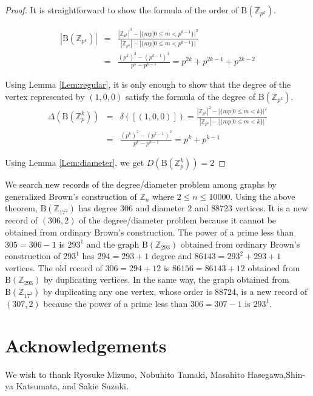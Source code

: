 \documentclass{article}
\newcommand{\Z}{\mathbb Z}
\newcommand{\B}{\mathrm{B}}
\begin{document}
\begin{proof}
It is straightforward to show the formula of the order of $\B(\Z_{p^k})$.

\begin{eqnarray*}
|\B(\Z_{p^k})| & = & \frac{|\Z_{p^k}|^3 - |\{ mp | 0 \leq m < p^{k-1} \}|^3}{|\Z_{p^k}|-|\{ mp | 0 \leq m < p^{k-1} \}|} \\ 
& = & \frac{(p^k)^3 - (p^{k-1})^3}{p^k-p^{k-1}} = p^{2k}+p^{2k-1}+p^{2k-2}
\end{eqnarray*}

Using Lemma \ref{Lem:regular}, it is only enough to show that the degree of the vertex represented by $(1,0,0)$ satisfy the formula of the degree of $\B(\Z_{p^k})$. 
\begin{eqnarray*}
\Delta(\B(\Z_p^k)) & = & \delta([(1,0,0)]) = \frac{|\Z_{p^k}|^2 - |\{ mp | 0 \leq m < k \}|^2 }{|\Z_{p^k}|-|\{ mp | 0 \leq m < k \}|} \\
& = & \frac{(p^k)^2 - (p^{k-1})^2}{p^k-p^{k-1}} = p^k + p^{k-1}
\end{eqnarray*}

Using Lemma \ref{Lem:diameter}, we get $D(\B(\Z_p^k)) = 2$

\end{proof}

We search new records of the degree/diameter problem among graphs by generalized Brown's construction of $\Z_n$ where $2 \leq n \leq 10000$.
Using the above theorem, $\B(\Z_{17^2})$ has degree $306$ and diameter $2$ and $88723$ vertices.
It is a new record of $(306,2)$ of the degree/diameter problem because it cannot be obtained from ordinary Brown's construction.
The power of a prime less than $305=306 - 1$ is $293^1$ and the graph $\B(\Z_{293})$ obtained from ordinary Brown's construction of $293^1$ has $294=293+1$ degree and $86143=293^2+293+1$ vertices.
The old record of $306=294+12$ is $86156=86143+12$ obtained from $\B(\Z_{293})$ by duplicating vertices.
In the same way, the graph obtained from $\B(\Z_{17^2})$ by duplicating any one vertex, whose order is $88724$, is a new record of $(307,2)$ because the power of a prime less than $306=307-1$ is $293^1$.

\section*{Acknowledgements}
We wish to thank Ryosuke Mizuno, Nobuhito Tamaki, Masahito Hasegawa,Shin-ya Katsumata, and Sakie Suzuki.



\end{document}
